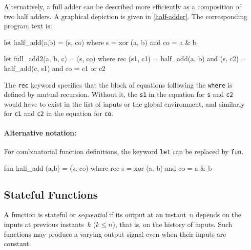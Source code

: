\documentclass[11pt,titlepage,twoside]{report}
\makeatletter
\newcommand{\zls}[1]{{\@span{class="zelusinline"}#1}}
\newcommand{\zls}[1]{\texttt{#1}}
\renewcommand{\zls}[1]{\texttt{#1}}
\makeatother
\begin{document}
Alternatively, a full adder can be described more efficiently as a 
composition
of two half adders. A graphical depiction is given in
\cref{half-adder}. The corresponding program text is:
\begin{chklisting}
let half_add(a,b) = (s, co) where
       s = xor (a, b)
   and co = a & b
\end{chklisting}
%
\begin{chklisting}
let full_add2(a, b, c) = (s, co) where
  rec (s1, c1) = half_add(a, b)
  and (s, c2) = half_add(c, s1)
  and co = c1 or c2
\end{chklisting}

The \zls{rec} keyword specifies that the block of equations following the 
\zls{where} is defined by mutual recursion.
Without it, the \zls{s1} in the equation for \zls{s} and \zls{c2} would have 
to exist in the list of inputs or the global environment, and similarly for 
\zls{c1} and \zls{c2} in the equation for \zls{co}.

\paragraph{Alternative notation:} For combinatorial function definitions, 
the keyword \zls{let} can be replaced by \zls{fun}.
\begin{chklisting}[include=xor]
fun half_add (a,b) = (s, co) where
  rec s = xor (a, b)
  and co = a & b
\end{chklisting}

\subsection{Stateful Functions\label{nodefunc}} %

A function is stateful or \emph{sequential} if its output at an instant~$n$ 
depends on the inputs at previous instants~$k$ ($k \leq n$), that is, on the 
history of inputs.
Such functions may produce a varying output signal even when their inputs 
are constant.
\end{document}
